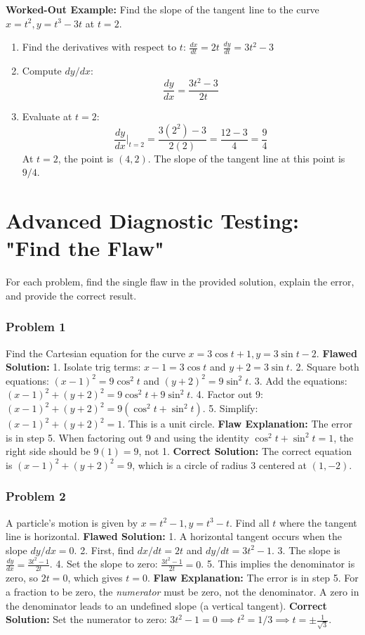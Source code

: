 \documentclass{article}
\begin{document}
\textbf{Worked-Out Example:} Find the slope of the tangent line to the curve \(x = t^2, y = t^3 - 3t\) at \(t = 2\).
\begin{enumerate}
    \item Find the derivatives with respect to \(t\):
    \( \frac{dx}{dt} = 2t \)
    \( \frac{dy}{dt} = 3t^2 - 3 \)
    \item Compute \(dy/dx\):
    \[ \frac{dy}{dx} = \frac{3t^2 - 3}{2t} \]
    \item Evaluate at \(t=2\):
    \[ \frac{dy}{dx}\bigg|_{t=2} = \frac{3(2^2) - 3}{2(2)} = \frac{12 - 3}{4} = \frac{9}{4} \]
    At \(t=2\), the point is \((4, 2)\). The slope of the tangent line at this point is \(9/4\).
\end{enumerate}

\section{Advanced Diagnostic Testing: "Find the Flaw"}
For each problem, find the single flaw in the provided solution, explain the error, and provide the correct result.

\subsubsection{Problem 1}
Find the Cartesian equation for the curve \( x = 3\cos t + 1, y = 3\sin t - 2 \).
\textbf{Flawed Solution:}
1. Isolate trig terms: \( x - 1 = 3\cos t \) and \( y + 2 = 3\sin t \).
2. Square both equations: \( (x - 1)^2 = 9\cos^2 t \) and \( (y + 2)^2 = 9\sin^2 t \).
3. Add the equations: \( (x - 1)^2 + (y + 2)^2 = 9\cos^2 t + 9\sin^2 t \).
4. Factor out 9: \( (x - 1)^2 + (y + 2)^2 = 9(\cos^2 t + \sin^2 t) \).
5. Simplify: \( (x - 1)^2 + (y + 2)^2 = 1 \). This is a unit circle.
\newline
\textbf{Flaw Explanation:}
The error is in step 5. When factoring out 9 and using the identity \(\cos^2 t + \sin^2 t = 1\), the right side should be \(9(1)=9\), not 1.
\textbf{Correct Solution:} The correct equation is \( (x - 1)^2 + (y + 2)^2 = 9 \), which is a circle of radius 3 centered at \((1, -2)\).

\subsubsection{Problem 2}
A particle's motion is given by \( x = t^2 - 1, y = t^3 - t \). Find all \(t\) where the tangent line is horizontal.
\textbf{Flawed Solution:}
1. A horizontal tangent occurs when the slope \(dy/dx = 0\).
2. First, find \(dx/dt = 2t\) and \(dy/dt = 3t^2 - 1\).
3. The slope is \( \frac{dy}{dx} = \frac{3t^2 - 1}{2t} \).
4. Set the slope to zero: \( \frac{3t^2 - 1}{2t} = 0 \).
5. This implies the denominator is zero, so \( 2t = 0 \), which gives \( t = 0 \).
\newline
\textbf{Flaw Explanation:}
The error is in step 5. For a fraction to be zero, the \textit{numerator} must be zero, not the denominator. A zero in the denominator leads to an undefined slope (a vertical tangent).
\textbf{Correct Solution:} Set the numerator to zero: \( 3t^2 - 1 = 0 \implies t^2 = 1/3 \implies t = \pm\frac{1}{\sqrt{3}} \).
\end{document}
